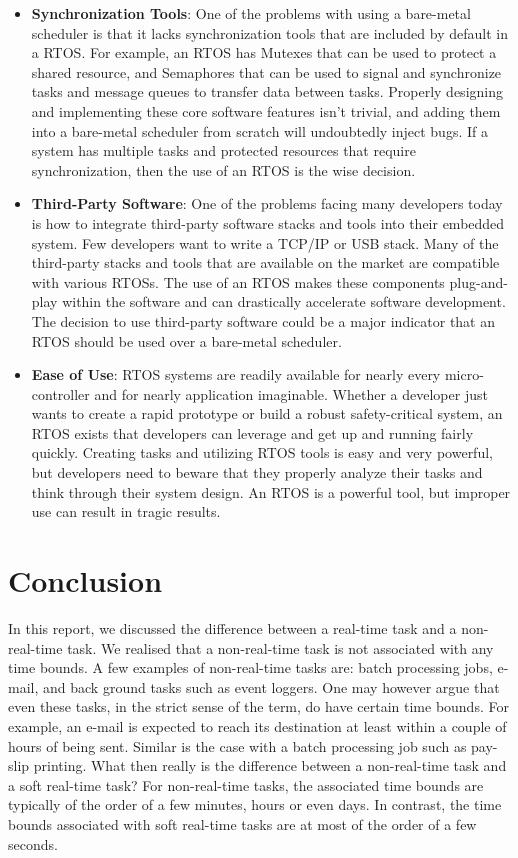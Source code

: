 \documentclass[12pt]{report}
\begin{document}
\begin{itemize}
    \item \textbf{Synchronization Tools}: One of the problems with using a bare-metal scheduler is that it lacks synchronization tools that are included by default in a RTOS. For example, an RTOS has Mutexes that can be used to protect a shared resource, and Semaphores that can be used to signal and synchronize tasks and message queues to transfer data between tasks. Properly designing and implementing these core software features isn't trivial, and adding them into a bare-metal scheduler from scratch will undoubtedly inject bugs. If a system has multiple tasks and protected resources that require synchronization, then the use of an RTOS is the wise decision.
    \item \textbf{Third-Party Software}: One of the problems facing many developers today is how to integrate third-party software stacks and tools into their embedded system. Few developers want to write a TCP/IP or USB stack. Many of the third-party stacks and tools that are available on the market are compatible with various RTOSs. The use of an RTOS makes these components plug-and-play within the software and can drastically accelerate software development. The decision to use third-party software could be a major indicator that an RTOS should be used over a bare-metal scheduler.
    \item \textbf{Ease of Use}: RTOS systems are readily available for nearly every micro-controller and for nearly application imaginable. Whether a developer just wants to create a rapid prototype or build a robust safety-critical system, an RTOS exists that developers can leverage and get up and running fairly quickly. Creating tasks and utilizing RTOS tools is easy and very powerful, but developers need to beware that they properly analyze their tasks and think through their system design. An RTOS is a powerful tool, but improper use can result in tragic results.
\end{itemize}

\chapter{Conclusion}
In this report, we discussed the difference between a real-time task and a non-real-time task. We realised that a  non-real-time task is not associated with any time bounds.  A few examples of non-real-time tasks  are:  batch  processing  jobs,  e-mail,  and  back  ground  tasks  such  as  event  loggers.   One may however argue that even these tasks, in the strict sense of the term, do have certain time bounds.  For example, an e-mail is expected to reach its destination at least within a couple of hours of being sent.  Similar is the case with a batch processing job such as pay-slip printing. What then really is the difference between a non-real-time task and a soft real-time task?  For non-real-time  tasks,  the  associated  time  bounds  are  typically  of  the  order  of  a  few  minutes, hours or even days.  In contrast, the time bounds associated with soft real-time tasks are at most of the order of a few seconds. \\ 
\end{document}
